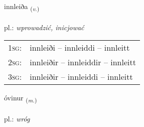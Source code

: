 \documentclass[frontgrid, backgrid]{flacards}\usepackage[]{graphicx}\usepackage[]{xcolor}
\begin{document}
\renewcommand{\flhead}{\vskip5pt \fboxsep=0pt {\small\bfseries\footnotesize Sagnorð | czasownik}}
\renewcommand{\fcfoot}{\vskip5pt \fboxsep=0pt \hspace{2pt}{\small\bfseries\footnotesize 3K}}

\renewcommand{\blhead}{\vskip5pt {\small\bfseries\footnotesize Sagnorð | czasownik }}
\renewcommand{\bcfoot}{\vskip5pt \hspace{2pt}{\small\bfseries\footnotesize 3K}}


{innleiða \small{\textsubscript{(\textit{v.})}} \\[1ex] %
\textphonetic{[ɪnleiða]} \\
pl.: \emph{wprowadzić, inicjować} \\  [2ex]
\renewcommand*{\arraystretch}{0.8}
\begin{tabular}{p{1cm}l}
\textsc{1sg}: & innleiði -- innleiddi -- innleitt \\ 
\textsc{2sg}: & innleiðir -- innleiddir -- innleitt \\ 
\textsc{3sg}: & innleiðir -- innleiddi -- innleitt \\ 
\end{tabular}
}

\renewcommand{\flhead}{\vskip5pt \fboxsep=0pt {\small\bfseries\footnotesize Nafnorð | rzeczownik}}
\renewcommand{\fcfoot}{\vskip5pt \fboxsep=0pt \hspace{2pt}{\small\bfseries\footnotesize 3K}}

\renewcommand{\blhead}{\vskip5pt {\small\bfseries\footnotesize Nafnorð | rzeczownik }}
\renewcommand{\bcfoot}{\vskip5pt \hspace{2pt}{\small\bfseries\footnotesize 3K}}


{óvinur \small{\textsubscript{(\textit{m.})}} \\[1ex] %
\textphonetic{[ouːvɪnʏr]} \\
pl.: \emph{wróg} \\  [2ex]
\renewcommand*{\arraystretch}{0.8}
}
\end{document}
